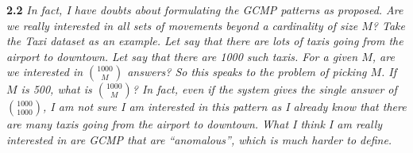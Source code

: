 %
%
%
%


\textbf{2.2} \emph{In fact, I have doubts about formulating the GCMP patterns as proposed. Are
we really interested in all sets of movements beyond a cardinality of size $M$? 
Take the Taxi dataset as an example. Let say that there are lots of taxis going
from the airport to downtown. Let say that there are 1000 such taxis. For a
given $M$, are we interested in ${1000 \choose M}$ answers? 
So this speaks to the problem of picking $M$. If $M$ is 500, what is ${1000 \choose M}$? In fact, even if the
system gives the single answer of ${1000\choose 1000}$,
I am not sure I am
interested in this pattern as I already know that there are many taxis going from
the airport to downtown. What I think I am really interested in are GCMP that
are ``anomalous'', which is much harder to define.}

